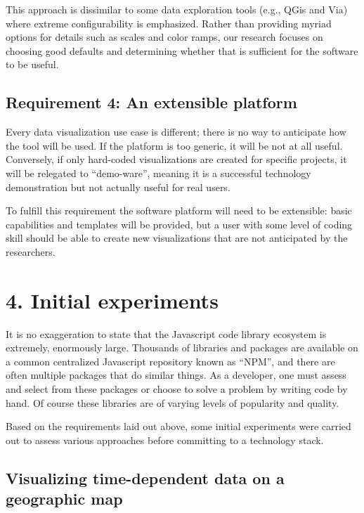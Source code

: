 This approach is dissimilar to some data exploration tools (e.g., QGis and Via) where extreme configurability is emphasized. Rather than providing myriad options for details such as scales and color ramps, our research focuses on choosing good defaults and determining whether that is sufficient for the software to be useful.

\hypertarget{requirement-4-an-extensible-platform}{%
\subsection{Requirement 4: An extensible platform}\label{requirement-4-an-extensible-platform}}

Every data visualization use case is different; there is no way to anticipate how the tool will be used. If the platform is too generic, it will be not at all useful. Conversely, if only hard-coded visualizations are created for specific projects, it will be relegated to ``demo-ware'', meaning it is a successful technology demonstration but not actually useful for real users.

To fulfill this requirement the software platform will need to be extensible: basic capabilities and templates will be provided, but a user with some level of coding skill should be able to create new visualizations that are not anticipated by the researchers.

\hypertarget{initial-experiments}{%
\section{4. Initial experiments}\label{initial-experiments}}

It is no exaggeration to state that the Javascript code library ecosystem is extremely, enormously large. Thousands of libraries and packages are available on a common centralized Javascript repository known as ``NPM'', and there are often multiple packages that do similar things. As a developer, one must assess and select from these packages or choose to solve a problem by writing code by hand. Of course these libraries are of varying levels of popularity and quality.

Based on the requirements laid out above, some initial experiments were carried out to assess various approaches before committing to a technology stack.

\hypertarget{visualizing-time-dependent-data-on-a-geographic-map}{%
\subsection{Visualizing time-dependent data on a geographic
map}\label{visualizing-time-dependent-data-on-a-geographic-map}}

